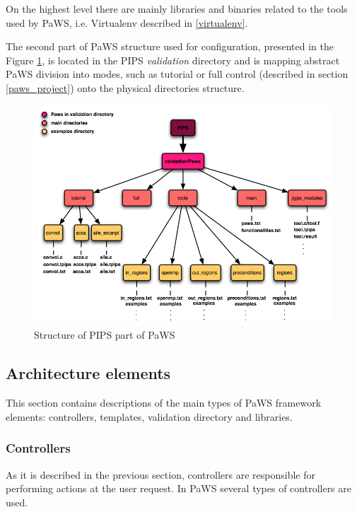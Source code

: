 On the highest level there are mainly libraries and binaries related to the tools used by PaWS, i.e. Virtualenv described in \ref{virtualenv}.

The second part of PaWS structure used for configuration, presented in the Figure \ref{fig:pips_structure}, is located in the PIPS \emph{validation} directory and is mapping abstract PaWS division into modes, such as tutorial or full control (described in section \ref{paws_project}) onto the physical directories structure.

\begin{figure}[h!]
  \centering
  \includegraphics[width=1.0\textwidth]{reportCh2/pips-structure}
  \caption{Structure of PIPS part of PaWS}
  \label{fig:pips_structure}
\end{figure}

\subsection{Architecture elements}
\label{architecture_elements}

This section contains descriptions of the main types of PaWS framework elements: controllers, templates, validation directory and libraries.

\subsubsection{Controllers}

As it is described in the previous section, controllers are responsible for performing actions at the user request. In PaWS several types of controllers are used. 

